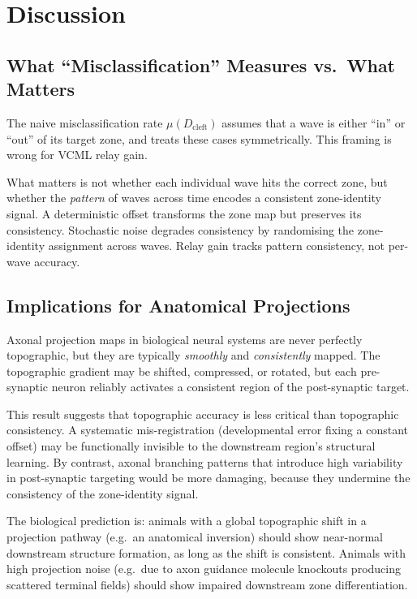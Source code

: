\documentclass[11pt]{article}
\begin{document}
\section{Discussion}

\subsection{What ``Misclassification'' Measures vs.\ What Matters}

The naive misclassification rate $\mu(D_\mathrm{cleft})$ assumes that
a wave is either ``in'' or ``out'' of its target zone, and treats these
cases symmetrically.
This framing is wrong for VCML relay gain.

What matters is not whether each individual wave hits the correct zone,
but whether the \emph{pattern} of waves across time encodes a consistent
zone-identity signal.
A deterministic offset transforms the zone map but preserves its
consistency.
Stochastic noise degrades consistency by randomising the zone-identity
assignment across waves.
Relay gain tracks pattern consistency, not per-wave accuracy.

\subsection{Implications for Anatomical Projections}

Axonal projection maps in biological neural systems are never perfectly
topographic, but they are typically \emph{smoothly} and
\emph{consistently} mapped.
The topographic gradient may be shifted, compressed, or rotated, but
each pre-synaptic neuron reliably activates a consistent region of the
post-synaptic target.

This result suggests that topographic accuracy is less critical than
topographic consistency.
A systematic mis-registration (developmental error fixing a constant
offset) may be functionally invisible to the downstream region's
structural learning.
By contrast, axonal branching patterns that introduce high variability
in post-synaptic targeting would be more damaging, because they
undermine the consistency of the zone-identity signal.

The biological prediction is: animals with a global topographic shift in
a projection pathway (e.g.\ an anatomical inversion) should show near-normal
downstream structure formation, as long as the shift is consistent.
Animals with high projection noise (e.g.\ due to axon guidance molecule
knockouts producing scattered terminal fields) should show impaired
downstream zone differentiation.
\end{document}
